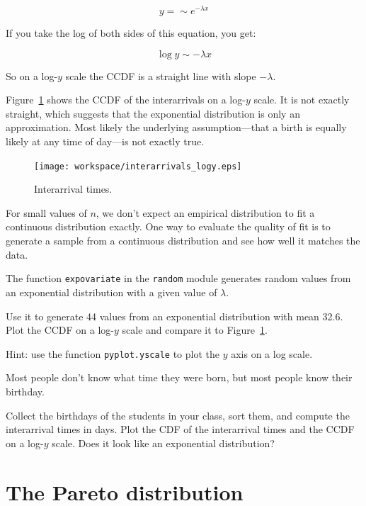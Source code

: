 \documentclass[12pt]{book}
\begin{document}
\[ y = \sim e^{-\lambda x} \]

If you take the log of both sides of this equation, you get:

\[ \log y \sim -\lambda x \]

So on a log-$y$ scale the CCDF is a straight line
with slope $-\lambda$.

Figure~\ref{interarrivals_logy} shows the CCDF of the interarrivals on
a log-$y$ scale.  It is not exactly straight, which suggests that the
exponential distribution is only an approximation.  Most likely the
underlying assumption---that a birth is equally likely at any time of
day---is not exactly true.

\begin{figure}
\centerline{\texttt{[image: workspace/interarrivals\_logy.eps]}}
\caption{Interarrival times.}
\label{interarrivals_logy}
\end{figure}

\begin{ex}
For small values of $n$, we don't expect an empirical distribution
to fit a continuous distribution exactly.  One way to evaluate
the quality of fit is to generate a sample from a continuous
distribution and see how well it matches the data.

The function {\tt expovariate} in the {\tt random} module
generates random values from an exponential distribution with
a given value of $\lambda$.

Use it to generate 44 values from an exponential distribution with
mean 32.6.  Plot the CCDF on a log-$y$ scale and compare
it to Figure~\ref{interarrivals_logy}.

Hint: use the function {\tt pyplot.yscale} to plot the $y$ axis
on a log scale.
\end{ex}

\begin{ex}
Most people don't know what time they were born, but most people know
their birthday.

Collect the birthdays of the students in your class, sort them, and
compute the interarrival times in days.  Plot the CDF of the interarrival
times and the CCDF on a log-$y$ scale.  Does it look like
an exponential distribution?
\end{ex}


\section{The Pareto distribution}
\end{document}
